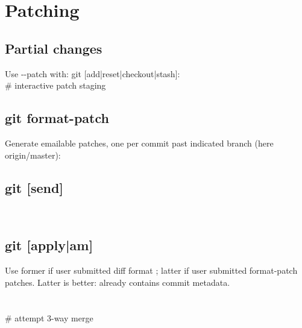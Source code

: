 \section{Patching}


\subsection*{Partial changes}
Use -{}-patch with: git [add|reset|checkout|stash]: \\
 \# interactive patch staging

\subsection*{git format-patch}
Generate emailable patches, one per commit 
past indicated branch (here origin/master): \\


\subsection*{git [send]}
\\


\subsection*{git [apply|am]}
{\footnotesize Use former if user submitted diff format ; latter if user submitted format-patch patches.  Latter is better: already contains commit metadata.}\\
\\
\\
 \# attempt 3-way merge
